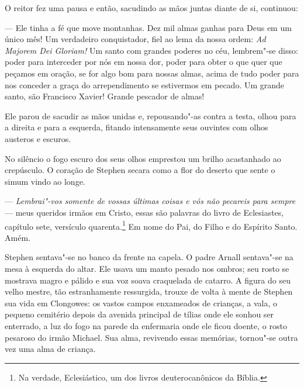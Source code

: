 O reitor fez uma pausa e então, sacudindo as mãos juntas diante de si,
continuou:

 --- Ele tinha a fé que move montanhas. Dez mil almas ganhas para Deus em
um único mês! Um verdadeiro conquistador, fiel ao lema da nossa ordem:
\textit{Ad Majorem Dei Gloriam!} Um santo com grandes poderes no céu,
lembrem"-se disso: poder para interceder por nós em nossa dor, poder
para obter o que quer que peçamos em oração, se for algo bom para
nossas almas, acima de tudo poder para nos conceder a graça do   
arrependimento se estivermos em pecado. Um grande santo, são Francisco
Xavier! Grande pescador de almas!

Ele parou de sacudir as mãos unidas e, repousando"-as contra a testa,
olhou para a direita e para a esquerda, fitando intensamente seus
ouvintes com olhos austeros e escuros.

No silêncio o fogo escuro dos seus olhos emprestou um brilho acastanhado
ao crepúsculo. O coração de Stephen secara como a flor do deserto que
sente o simum vindo ao longe.

\asterisc

 --- \textit{Lembrai"-vos somente de vossas últimas coisas e vós não
pecareis para sempre} --- meus queridos irmãos em Cristo, essas são
palavras do livro de Eclesiastes, capítulo sete, versículo
quarenta.\footnote{ Na verdade, Eclesiástico, um dos livros
deuterocanônicos da Bíblia.} Em nome do Pai, do Filho e do Espírito
Santo. Amém.

Stephen sentava"-se no banco da frente na capela. O padre Arnall
sentava"-se na mesa à esquerda do altar. Ele usava um manto pesado nos
ombros; seu rosto se mostrava magro e pálido e sua voz soava craquelada
de catarro. A figura do seu velho mestre, tão estranhamente ressurgida,
trouxe de volta à mente de Stephen sua vida em Clongowes: os vastos
campos enxameados de crianças, a vala, o pequeno cemitério depois da
avenida principal de tílias onde ele sonhou ser enterrado, a luz do
fogo na parede da enfermaria onde ele ficou doente, o rosto pesaroso do
irmão Michael. Sua alma, revivendo essas memórias, tornou"-se outra vez
uma alma de criança.

